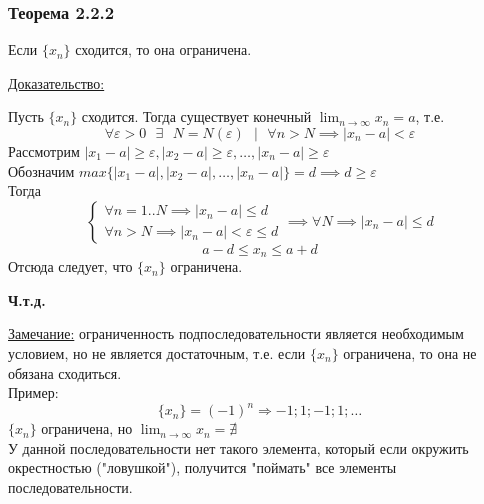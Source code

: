 \documentclass[12pt]{article}
\def\posl#1#2{\{#1_{#2}\}}
\begin{document}
    \subsubsection*{Теорема 2.2.2}\label{th:2.2.2}
    Если $\posl{x}{n}$ сходится, то она ограничена.\par\noindent
    \underline{Доказательство:}
    \begin{adjustwidth}{1.5em}{1.5em}
        Пусть $\posl{x}{n}$ сходится. Тогда существует конечный $\lim_{n\to\infty}x_n = a$, т.е.
        \[
            \forall \varepsilon > 0 \text{ } \exists \text{ } N = N(\varepsilon) \text{ } \big| \text{ } \forall n > N \implies |x_n - a| < \varepsilon
        \]
        Рассмотрим $|x_{1} - a| \ge \varepsilon, |x_{2} - a| \ge \varepsilon, \dots, |x_n - a| \ge \varepsilon$\\
        Обозначим $max\{|x_{1} - a|, |x_{2} - a|, \dots, |x_n - a|\} = d \implies d \ge \varepsilon$\\
        Тогда
        \[
            \begin{cases}
                \forall n = 1..N \implies |x_n - a| \le d\\
                \forall n > N \implies |x_n - a| < \varepsilon \le d
            \end{cases}
            \implies
            \forall N \implies |x_n - a| \le d
        \]
        \[
            a - d \le x_n \le a + d
        \]
        Отсюда следует, что $\posl{x}{n}$ ограничена.\\
        \begin{center}
            \textbf{Ч.т.д.}
        \end{center}
    \end{adjustwidth}
    
    \noindent \underline{Замечание:} ограниченность подпоследовательности является необходимым условием, но не является достаточным, т.е. если $\posl{x}{n}$ ограничена, то она не обязана сходиться.\\
    Пример:
    \[
        \posl{x}{n} = (-1)^n \Rightarrow -1; 1; -1; 1; \dots
    \]
    $\posl{x}{n}$ ограничена, но $\lim_{n\to\infty}x_n = \nexists$\\
    У данной последовательности нет такого элемента, который если окружить окрестностью ("ловушкой"), получится "поймать" все элементы последовательности.
    
\end{document}
